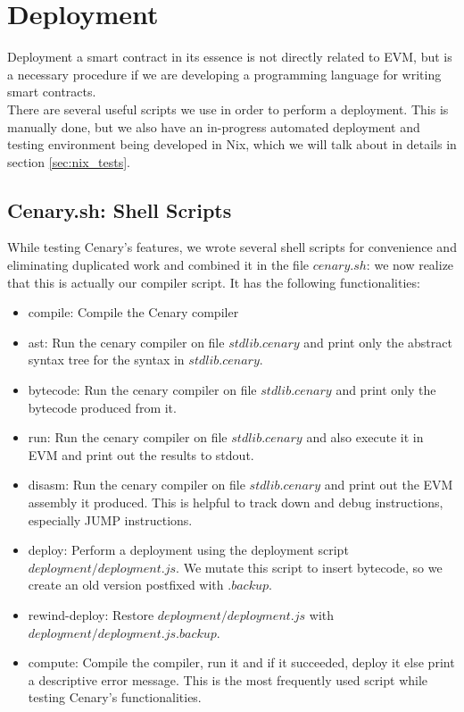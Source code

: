 \documentclass{article}
\begin{document}
\section{Deployment}
\label{deployment}
Deployment a smart contract in its essence is not directly related to EVM, but is a necessary procedure if we are developing a programming language for writing smart contracts. \\
There are several useful scripts we use in order to perform a deployment. This is manually done, but we also have an in-progress automated deployment and testing environment being developed in Nix, which we will talk about in details in section \ref{sec:nix_tests}.
\subsection{Cenary.sh: Shell Scripts}
While testing Cenary's features, we wrote several shell scripts for convenience and eliminating duplicated work and combined it in the file $cenary.sh$: we now realize that this is actually our compiler script. It has the following functionalities:
\newpage
\begin{itemize}
  \item compile: Compile the Cenary compiler
  \item ast: Run the cenary compiler on file $stdlib.cenary$ and print only the abstract syntax tree for the syntax in $stdlib.cenary$.
  \item bytecode: Run the cenary compiler on file $stdlib.cenary$ and print only the bytecode produced from it.
  \item run: Run the cenary compiler on file $stdlib.cenary$ and also execute it in EVM and print out the results to stdout.
  \item disasm: Run the cenary compiler on file $stdlib.cenary$ and print out the EVM assembly it produced. This is helpful to track down and debug instructions, especially JUMP instructions.
  \item deploy: Perform a deployment using the deployment script $deployment/deployment.js$. We mutate this script to insert bytecode, so we create an old version postfixed with $.backup$.
  \item rewind-deploy: Restore $deployment/deployment.js$ with $deployment/deployment.js.backup$.
  \item compute: Compile the compiler, run it and if it succeeded, deploy it else print a descriptive error message. This is the most frequently used script while testing Cenary's functionalities.
\end{itemize}
\end{document}

